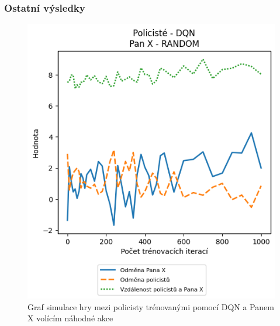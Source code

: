 \subsubsection{Ostatní výsledky}

\begin{figure}[H]
  \centering
  \begin{minipage}{.48\textwidth}
    \centering
    \includegraphics[width=1\textwidth]{obrazky-figures/graphs/cop_DQN_mrx_RANDOM}
    \caption{Graf simulace hry mezi policisty trénovanými pomocí DQN a Panem X volícím náhodné akce}
    \label{fig:cop_dqn_mrx_random}
  \end{minipage}\hfill
  \begin{minipage}{.48\textwidth}
    \centering

\end{minipage}
\end{figure}
